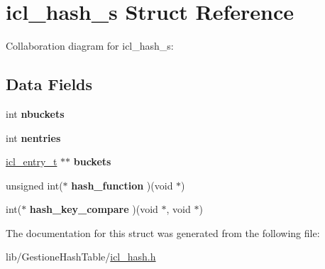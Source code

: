 \hypertarget{structicl__hash__s}{}\section{icl\+\_\+hash\+\_\+s Struct Reference}
\label{structicl__hash__s}


Collaboration diagram for icl\+\_\+hash\+\_\+s\+:
\subsection*{Data Fields}
\begin{DoxyCompactItemize}
\item 
\mbox{\label{structicl__hash__s_aae6f48b7de100bafe113b88c71398f0b}} 
int {\bfseries nbuckets}
\item 
\mbox{\label{structicl__hash__s_a3a75b2f78441699f9deb4f71637293a5}} 
int {\bfseries nentries}
\item 
\mbox{\label{structicl__hash__s_af9e8fe1c1281e48f79ead2c357258459}} 
\hyperlink{structicl__entry__s}{icl\+\_\+entry\+\_\+t} $\ast$$\ast$ {\bfseries buckets}
\item 
\mbox{\label{structicl__hash__s_a9145080f537dc55ab4bea471286eb8f7}} 
unsigned int($\ast$ {\bfseries hash\+\_\+function} )(void $\ast$)
\item 
\mbox{\label{structicl__hash__s_aaf9232d19b877d38fbfedf9535aba833}} 
int($\ast$ {\bfseries hash\+\_\+key\+\_\+compare} )(void $\ast$, void $\ast$)
\end{DoxyCompactItemize}


The documentation for this struct was generated from the following file\+:\begin{DoxyCompactItemize}
\item 
lib/\+Gestione\+Hash\+Table/\hyperlink{icl__hash_8h}{icl\+\_\+hash.\+h}\end{DoxyCompactItemize}
